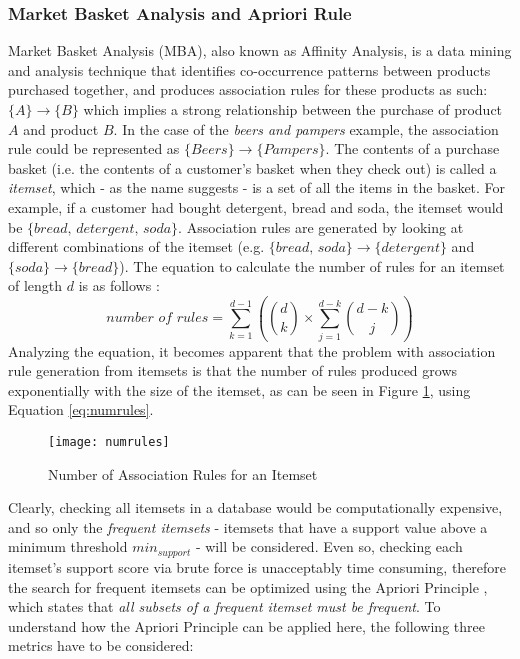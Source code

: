 \documentclass[a4paper,11pt]{article}
\newcommand{\setA}{\{A\}}
\newcommand{\setB}{\{B\}}
\newcommand{\abrule}{\setA\rightarrow\setB}
\begin{document}
\subsubsection{Market Basket Analysis and Apriori Rule}
\label{mba_define}
Market Basket Analysis (MBA), also known as Affinity Analysis, is a data mining and analysis technique that identifies co-occurrence patterns between products purchased together, and produces association rules for these products as such: $\abrule$ which implies a strong relationship between the purchase of product $A$ and product $B$. In the case of the \textit{beers and pampers} example, the association rule could be represented as $\{Beers\} \rightarrow \{Pampers\}$. The contents of a purchase basket (i.e. the contents of a customer's basket when they check out) is called a \textit{itemset}, which - as the name suggests - is a set of all the items in the basket.  For example, if a customer had bought detergent, bread and soda, the itemset would be $\{\textit{bread, detergent, soda}\}$. Association rules are generated by looking at different combinations of the itemset (e.g. $\{\textit{bread, soda}\}\rightarrow\{\textit{detergent}\}$ and $\{\textit{soda}\}\rightarrow\{\textit{bread}\}$). 
The equation \cite{num_rules} to calculate the number of rules for an itemset of length $d$ is as follows :\\
\begin{equation}
\textit{number of rules} = \sum\limits_{k=1}^{d-1} \left(\binom{d}{k} \times \sum\limits_{j=1}^{d-k}\binom{d-k}{j}  \right)
\label{eq:numrules}
\end{equation}
Analyzing the equation, it becomes apparent that the problem with association rule generation from itemsets is that the number of rules produced grows exponentially with the size of the itemset, as can be seen in Figure \ref{fig:numrules}, using Equation \ref{eq:numrules}.  
\begin{figure}[H]
\centering
\texttt{[image: numrules]}
\caption{Number of Association Rules for an Itemset}
\label{fig:numrules}
\end{figure}
Clearly, checking all itemsets in a database would be computationally expensive, and so only the \textit{frequent itemsets} - itemsets that have a support value above a minimum threshold $\textit{min}_{\textit{support}}$ - will be considered. Even so, checking each itemset's support score via brute force is unacceptably time consuming, therefore the search for frequent itemsets can be optimized using the Apriori Principle \cite{mine}, which states that \textit{all subsets of a frequent itemset must be frequent}. To understand how the Apriori Principle can be applied here,  the following three metrics have to be considered:
\end{document}
